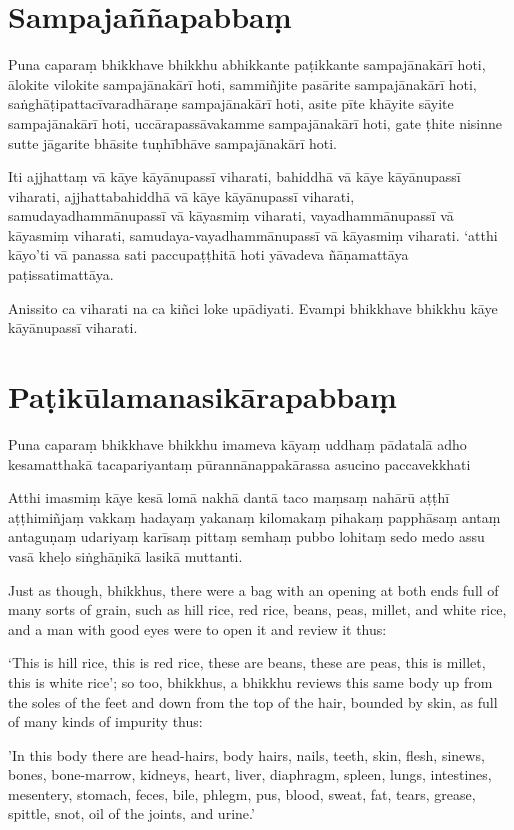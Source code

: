 \paliPage
\section*{Sampajaññapabbaṃ}

Puna caparaṃ bhikkhave bhikkhu abhikkante paṭikkante sampajānakārī hoti, ālokite
vilokite sampajānakārī hoti, sammiñjite pasārite sampajānakārī hoti,
saṅghāṭipattacīvaradhāraṇe sampajānakārī hoti, asite pīte khāyite sāyite
sampajānakārī hoti, uccārapassāvakamme sampajānakārī hoti, gate ṭhite nisinne
sutte jāgarite bhāsite tuṇhībhāve sampajānakārī hoti.

Iti ajjhattaṃ vā kāye kāyānupassī viharati, bahiddhā vā kāye kāyānupassī
viharati, ajjhattabahiddhā vā kāye kāyānupassī viharati, samudayadhammānupassī
vā kāyasmiṃ viharati, vayadhammānupassī vā kāyasmiṃ viharati,
samudaya-vayadhammānupassī vā kāyasmiṃ viharati. `atthi kāyo'ti vā panassa sati
paccupaṭṭhitā hoti yāvadeva ñāṇamattāya paṭissatimattāya.

Anissito ca viharati na ca kiñci loke upādiyati. Evampi bhikkhave bhikkhu kāye
kāyānupassī viharati.


\section*{Paṭikūlamanasikārapabbaṃ}

Puna caparaṃ bhikkhave bhikkhu imameva kāyaṃ uddhaṃ pādatalā adho kesamatthakā
tacapariyantaṃ pūrannānappakārassa asucino paccavekkhati

Atthi imasmiṃ kāye kesā lomā nakhā dantā taco maṃsaṃ nahārū aṭṭhī aṭṭhimiñjaṃ
vakkaṃ hadayaṃ yakanaṃ kilomakaṃ pihakaṃ papphāsaṃ antaṃ antaguṇaṃ udariyaṃ
karīsaṃ pittaṃ semhaṃ pubbo lohitaṃ sedo medo assu vasā kheḷo siṅghāṇikā lasikā
muttanti.

\englishPage

Just as though, bhikkhus, there were a bag with an opening at both ends full of
many sorts of grain, such as hill rice, red rice, beans, peas, millet, and white
rice, and a man with good eyes were to open it and review it thus:

‘This is hill rice, this is red rice, these are beans, these are peas, this is
millet, this is white rice’; so too, bhikkhus, a bhikkhu reviews this same body
up from the soles of the feet and down from the top of the hair, bounded by
skin, as full of many kinds of impurity thus:

'In this body there are head-hairs, body hairs, nails, teeth, skin, flesh,
sinews, bones, bone-marrow, kidneys, heart, liver, diaphragm, spleen, lungs,
intestines, mesentery, stomach, feces, bile, phlegm, pus, blood, sweat, fat,
tears, grease, spittle, snot, oil of the joints, and urine.'

